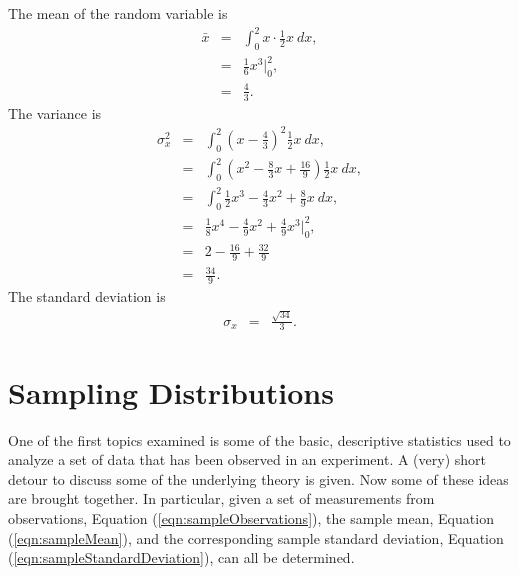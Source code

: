 \documentclass[12pt]{article}
\def\solutions{y}
\def\solutions{n}
\newtheorem{assignment}{Assignment}[section]
\newcommand{\lp}{\left(}
\newcommand{\rp}{\right)}
\begin{document}
The mean of the random variable is 
\begin{eqnarray*}
  \bar{x} & = & \int^2_0 x \cdot \frac{1}{2}x ~ dx, \\
  & = & \frac{1}{6} x^3 \bigg|^2_0, \\
  & = & \frac{4}{3}.
\end{eqnarray*}
The variance is
\begin{eqnarray*}
  \sigma^2_x & = & \int^2_0 \lp x - \frac{4}{3} \rp^2 \frac{1}{2}x ~ dx, \\
  & = & \int^2_0 \lp x^2 - \frac{8}{3} x + \frac{16}{9} \rp \frac{1}{2} x ~ dx, \\
  & = & \int^2_0 \frac{1}{2} x^3 - \frac{4}{3} x^2 + \frac{8}{9} x ~ dx, \\
  & = & \frac{1}{8} x^4 - \frac{4}{9} x^2 + \frac{4}{9} x^3 \bigg|^2_0, \\
  & = & 2 - \frac{16}{9} + \frac{32}{9} \\
  & = & \frac{34}{9}.
\end{eqnarray*}
The standard deviation is
\begin{eqnarray*}
  \sigma_x & = & \frac{\sqrt{34}}{3}.
\end{eqnarray*}


\fi



%
%
%
%



\section{Sampling Distributions}

One of the first topics examined is some of the basic, descriptive
statistics used to analyze a set of data that has been observed in an
experiment.  A (very) short detour to discuss some of the underlying
theory is given.  Now some of these ideas are brought together. In
particular, given a set of measurements from observations, Equation
(\ref{eqn:sampleObservations}), the sample mean, Equation
(\ref{eqn:sampleMean}), and the corresponding sample standard
deviation, Equation (\ref{eqn:sampleStandardDeviation}), can all be
determined.
\end{document}
